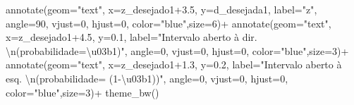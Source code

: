 \documentclass[
]{book}
\newenvironment{Shaded}{\begin{snugshade}}{\end{snugshade}}
\newcommand{\AttributeTok}[1]{\textcolor[rgb]{0.77,0.63,0.00}{#1}}
\newcommand{\DecValTok}[1]{\textcolor[rgb]{0.00,0.00,0.81}{#1}}
\newcommand{\FloatTok}[1]{\textcolor[rgb]{0.00,0.00,0.81}{#1}}
\newcommand{\FunctionTok}[1]{\textcolor[rgb]{0.00,0.00,0.00}{#1}}
\newcommand{\NormalTok}[1]{#1}
\newcommand{\SpecialCharTok}[1]{\textcolor[rgb]{0.00,0.00,0.00}{#1}}
\newcommand{\StringTok}[1]{\textcolor[rgb]{0.31,0.60,0.02}{#1}}
\begin{document}
\begin{Shaded}
\begin{Highlighting}[]
  \FunctionTok{annotate}\NormalTok{(}\AttributeTok{geom=}\StringTok{"text"}\NormalTok{, }\AttributeTok{x=}\NormalTok{z\_desejado1}\FloatTok{+3.5}\NormalTok{, }\AttributeTok{y=}\NormalTok{d\_desejada1, }\AttributeTok{label=}\StringTok{"z"}\NormalTok{, }\AttributeTok{angle=}\DecValTok{90}\NormalTok{, }\AttributeTok{vjust=}\DecValTok{0}\NormalTok{, }\AttributeTok{hjust=}\DecValTok{0}\NormalTok{, }\AttributeTok{color=}\StringTok{"blue"}\NormalTok{,}\AttributeTok{size=}\DecValTok{6}\NormalTok{)}\SpecialCharTok{+}
  \FunctionTok{annotate}\NormalTok{(}\AttributeTok{geom=}\StringTok{"text"}\NormalTok{, }\AttributeTok{x=}\NormalTok{z\_desejado1}\FloatTok{+4.5}\NormalTok{, }\AttributeTok{y=}\FloatTok{0.1}\NormalTok{, }\AttributeTok{label=}\StringTok{"Intervalo aberto à dir. }\SpecialCharTok{\textbackslash{}n}\StringTok{(probabilidade=\textbackslash{}u03b1)"}\NormalTok{, }\AttributeTok{angle=}\DecValTok{0}\NormalTok{, }\AttributeTok{vjust=}\DecValTok{0}\NormalTok{, }\AttributeTok{hjust=}\DecValTok{0}\NormalTok{, }\AttributeTok{color=}\StringTok{"blue"}\NormalTok{,}\AttributeTok{size=}\DecValTok{3}\NormalTok{)}\SpecialCharTok{+}
  \FunctionTok{annotate}\NormalTok{(}\AttributeTok{geom=}\StringTok{"text"}\NormalTok{, }\AttributeTok{x=}\NormalTok{z\_desejado1}\FloatTok{+1.3}\NormalTok{, }\AttributeTok{y=}\FloatTok{0.2}\NormalTok{, }\AttributeTok{label=}\StringTok{"Intervalo aberto à esq. }\SpecialCharTok{\textbackslash{}n}\StringTok{(probabilidade= (1{-}\textbackslash{}u03b1))"}\NormalTok{, }\AttributeTok{angle=}\DecValTok{0}\NormalTok{, }\AttributeTok{vjust=}\DecValTok{0}\NormalTok{, }\AttributeTok{hjust=}\DecValTok{0}\NormalTok{, }\AttributeTok{color=}\StringTok{"blue"}\NormalTok{,}\AttributeTok{size=}\DecValTok{3}\NormalTok{)}\SpecialCharTok{+}
  \FunctionTok{theme\_bw}\NormalTok{()}
\end{Highlighting}
\end{Shaded}
\end{document}
